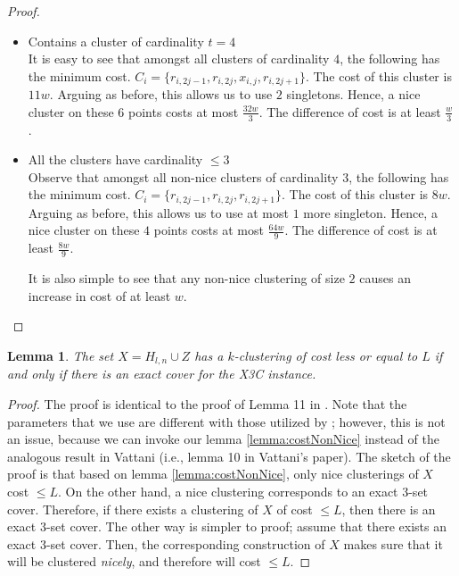 \documentclass[12pt]{article}
\newtheorem{lemma}[theorem]{Lemma}
\begin{document}
\begin{proof}
\begin{itemize}[nolistsep,leftmargin=*]
\item Contains a cluster of cardinality $t = 4$\\
It is easy to see that amongst all clusters of cardinality $4$, the following has the minimum cost. $C_i = \{r_{i, 2j-1}, r_{i, 2j}, x_{i,j}, r_{i, 2j+1}\}$. The cost of this cluster is $11w$. Arguing as before, this allows us to use $2$ singletons. Hence, a nice cluster on these $6$ points costs at most $\frac{32w}{3}$. The difference of cost is at least $\frac{w}{3}$.

\item All the clusters have cardinality $\le 3$ \\
Observe that amongst all non-nice clusters of cardinality $3$, the following has the minimum cost. $C_i = \{r_{i, 2j-1}, r_{i, 2j}, r_{i, 2j+1}\}$. The cost of this cluster is $8w$. Arguing as before, this allows us to use at most $1$ more singleton. Hence, a nice cluster on these $4$ points costs at most $\frac{64w}{9}$. The difference of cost is at least $\frac{8w}{9}$.

It is also simple to see that any non-nice clustering of size $2$ causes an increase in cost of at least $w$.

\end{itemize}
\end{proof}

\begin{lemma}
\label{lemma:kmeansEquivalenceX3C}
The set $X = H_{l,n} \cup Z$ has a $k$-clustering of cost less or equal to $L$ if and only if there is an exact cover for the X3C instance.
\end{lemma}

\begin{proof}
The proof is identical to the proof of Lemma 11 in \cite{vattani2009hardness}. Note that the parameters that we use are different with those utilized by \cite{vattani2009hardness}; however, this is not an issue, because we can invoke our lemma \ref{lemma:costNonNice} instead of the analogous result in Vattani (i.e., lemma 10 in Vattani's paper). The sketch of the proof is that based on lemma \ref{lemma:costNonNice}, only nice clusterings of $X$ cost $\le L$. On the other hand, a nice clustering corresponds to an exact 3-set cover. Therefore, if there exists a clustering of $X$ of cost $\le L$, then there is an exact 3-set cover. The other way is simpler to proof; assume that there exists an exact 3-set cover. Then, the corresponding construction of $X$ makes sure that it will be clustered \emph{nicely}, and therefore will cost $\le L$.  
\end{proof}
\end{document}

